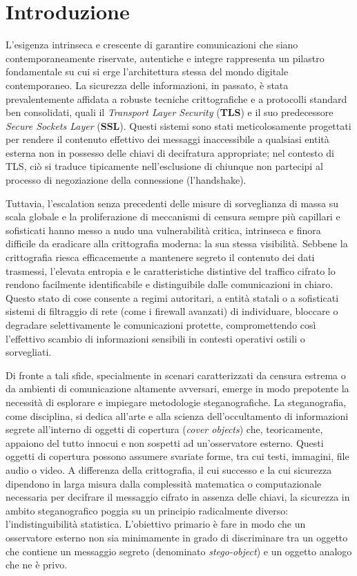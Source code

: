 
\chapter{Introduzione}\label{ch:introduzione}
L'esigenza intrinseca e crescente di garantire comunicazioni che siano contemporaneamente riservate, autentiche e integre rappresenta un pilastro fondamentale su cui si erge l'architettura stessa del mondo digitale contemporaneo. La sicurezza delle informazioni, in passato, è stata prevalentemente affidata a robuste tecniche crittografiche e a protocolli standard ben consolidati, quali il \emph{Transport Layer Security} (\textbf{TLS}) e il suo predecessore \emph{Secure Sockets Layer} (\textbf{SSL}). Questi sistemi sono stati meticolosamente progettati per rendere il contenuto effettivo dei messaggi inaccessibile a qualsiasi entità esterna non in possesso delle chiavi di decifratura appropriate; nel contesto di TLS, ciò si traduce tipicamente nell'esclusione di chiunque non partecipi al processo di negoziazione della connessione (l'handshake).

Tuttavia, l'escalation senza precedenti delle misure di sorveglianza di massa su scala globale e la proliferazione di meccanismi di censura sempre più capillari e sofisticati hanno messo a nudo una vulnerabilità critica, intrinseca e finora difficile da eradicare alla crittografia moderna: la sua stessa visibilità. Sebbene la crittografia riesca efficacemente a mantenere segreto il contenuto dei dati trasmessi, l'elevata entropia e le caratteristiche distintive del traffico cifrato lo rendono facilmente identificabile e distinguibile dalle comunicazioni in chiaro. Questo stato di cose consente a regimi autoritari, a entità statali o a sofisticati sistemi di filtraggio di rete (come i firewall avanzati) di individuare, bloccare o degradare selettivamente le comunicazioni protette, compromettendo così l'effettivo scambio di informazioni sensibili in contesti operativi ostili o sorvegliati.

Di fronte a tali sfide, specialmente in scenari caratterizzati da censura estrema o da ambienti di comunicazione altamente avversari, emerge in modo prepotente la necessità di esplorare e impiegare metodologie steganografiche. La steganografia, come disciplina, si dedica all'arte e alla scienza dell'occultamento di informazioni segrete all'interno di oggetti di copertura (\emph{cover objects}) che, teoricamente, appaiono del tutto innocui e non sospetti ad un'osservatore esterno. Questi oggetti di copertura possono assumere svariate forme, tra cui testi, immagini, file audio o video. A differenza della crittografia, il cui successo e la cui sicurezza dipendono in larga misura dalla complessità matematica o computazionale necessaria per decifrare il messaggio cifrato in assenza delle chiavi, la sicurezza in ambito steganografico poggia su un principio radicalmente diverso: l'indistinguibilità statistica. L'obiettivo primario è fare in modo che un osservatore esterno non sia minimamente in grado di discriminare tra un oggetto che contiene un messaggio segreto (denominato \emph{stego-object}) e un oggetto analogo che ne è privo.

